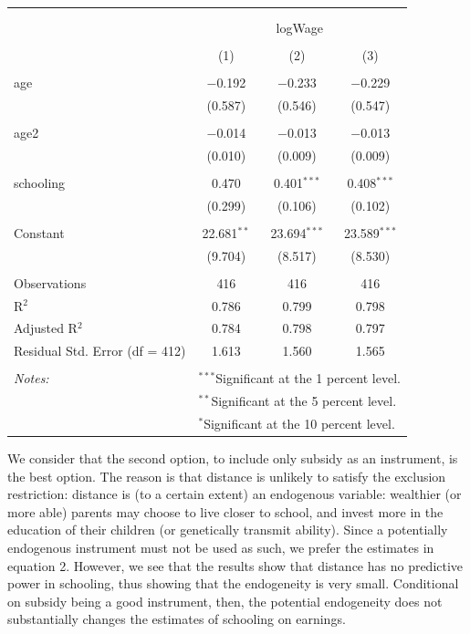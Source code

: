 \documentclass[
]{article}
\begin{document}
\begin{table}[!htbp] \centering 
  \caption{} 
  \label{} 
\small 
\begin{tabular}{@{\extracolsep{5pt}}lccc} 
\\[-1.8ex]\hline 
\hline \\[-1.8ex] 
\\[-1.8ex] & \multicolumn{3}{c}{logWage} \\ 
\\[-1.8ex] & (1) & (2) & (3)\\ 
\hline \\[-1.8ex] 
 age & $-$0.192 & $-$0.233 & $-$0.229 \\ 
  & (0.587) & (0.546) & (0.547) \\ 
  & & & \\ 
 age2 & $-$0.014 & $-$0.013 & $-$0.013 \\ 
  & (0.010) & (0.009) & (0.009) \\ 
  & & & \\ 
 schooling & 0.470 & 0.401$^{***}$ & 0.408$^{***}$ \\ 
  & (0.299) & (0.106) & (0.102) \\ 
  & & & \\ 
 Constant & 22.681$^{**}$ & 23.694$^{***}$ & 23.589$^{***}$ \\ 
  & (9.704) & (8.517) & (8.530) \\ 
  & & & \\ 
Observations & 416 & 416 & 416 \\ 
R$^{2}$ & 0.786 & 0.799 & 0.798 \\ 
Adjusted R$^{2}$ & 0.784 & 0.798 & 0.797 \\ 
Residual Std. Error (df = 412) & 1.613 & 1.560 & 1.565 \\ 
\hline \\[-1.8ex] 
\textit{Notes:} & \multicolumn{3}{l}{$^{***}$Significant at the 1 percent level.} \\ 
 & \multicolumn{3}{l}{$^{**}$Significant at the 5 percent level.} \\ 
 & \multicolumn{3}{l}{$^{*}$Significant at the 10 percent level.} \\ 
\end{tabular} 
\end{table}

We consider that the second option, to include only subsidy as an
instrument, is the best option. The reason is that distance is unlikely
to satisfy the exclusion restriction: distance is (to a certain extent)
an endogenous variable: wealthier (or more able) parents may choose to
live closer to school, and invest more in the education of their
children (or genetically transmit ability). Since a potentially
endogenous instrument must not be used as such, we prefer the estimates
in equation 2. However, we see that the results show that distance has
no predictive power in schooling, thus showing that the endogeneity is
very small. Conditional on subsidy being a good instrument, then, the
potential endogeneity does not substantially changes the estimates of
schooling on earnings.
\end{document}
